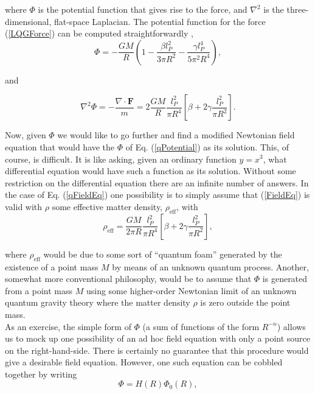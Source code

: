 \documentclass[nofootinbib,aps,prd,preprint,groupedaddress,showpacs,showkeys]{revtex4-1}
\begin{document}
\noindent where $\Phi$ is the potential function that gives rise to the force, and $\nabla^2$ is the three-dimensional, flat-space Laplacian. The potential function for the force (\ref{LQGForce}) can be computed straightforwardly \cite{ModestoRandono},
\begin{equation}
\Phi = -\frac{GM}{R} \left( 1 - \frac{\beta l_P^2}{3 \pi R^2} - \frac{\gamma l_P^4}{5 \pi^2 R^4} \right), \label{qPotential}
\end{equation}

\noindent and

\begin{equation}
\nabla^2 \Phi = -\frac{\nabla \cdot \mathbf{F}}{m} = 2 \frac{GM}{R} \frac{l_P^2}{\pi R^4} \left[ \beta + 2\gamma \frac{l_P^2}{\pi R^2} \right]. \label{qFieldEq}
\end{equation}

\indent Now, given $\Phi$ we would like to go further and find a modified Newtonian field equation that would have the $\Phi$ of Eq. (\ref{qPotential}) as its solution. This, of course, is difficult. It is like asking, given an ordinary function $y = x^3$, what differential equation would have such a function as its solution. Without some restriction on the differential equation there are an infinite number of answers. In the case of Eq. (\ref{qFieldEq}) one possibility is to simply assume that (\ref{FieldEq}) is valid with $\rho$ some effective matter density, $\rho_{\mbox{eff}}$, with
\begin{equation}
\rho_{\mbox{eff}} = \frac{GM}{2 \pi R} \frac{l_P^2}{\pi R^4} \left[ \beta + 2 \gamma \frac{l_P^2}{\pi R^2} \right],
\end{equation}

\noindent where $\rho_{\mbox{eff}}$ would be due to some sort of ``quantum foam'' generated by the existence of a point mass $M$  by means of an unknown quantum process. Another, somewhat more conventional philosophy, would be to assume that $\Phi$ is generated from a point mass $M$ using some higher-order Newtonian limit of an unknown quantum gravity theory where the matter density $\rho$ is zero outside the point mass.\\
\indent As an exercise, the simple form of $\Phi$ (a sum of functions of the form $R^{-n}$) allows us to mock up one possibility of an ad hoc field equation with only a point source on the right-hand-side. There is certainly no guarantee that this procedure would give a desirable field equation. However, one such equation can be cobbled together by writing
\begin{equation}
\Phi = H(R) \Phi_0(R),
\end{equation}
\end{document}
